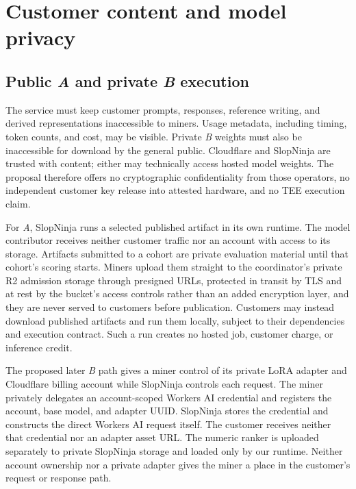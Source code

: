 \section{Customer content and model privacy}\label{confidential-customer-inference}

\subsection{Public \textit{A} and private \textit{B} execution}\label{customer-execution-modes}

The service must keep customer prompts, responses, reference writing, and
derived representations inaccessible to miners. Usage metadata, including
timing, token counts, and cost, may be visible. Private \textit{B} weights must
also be inaccessible for download by the general public. Cloudflare and
SlopNinja are trusted with content; either may technically access hosted model
weights. The proposal therefore offers no cryptographic confidentiality from
those operators, no independent customer key release into attested hardware,
and no TEE execution claim.

For \textit{A}, SlopNinja runs a selected published artifact in its own runtime.
The model contributor receives neither customer traffic nor an account with
access to its storage. Artifacts submitted to a cohort are private evaluation
material until that cohort's scoring starts. Miners upload them straight to the
coordinator's private R2 admission storage through presigned URLs, protected in
transit by TLS and at rest by the bucket's access controls rather than an added
encryption layer, and they are never served to customers before publication. Customers may instead download published artifacts and
run them locally, subject to their dependencies and execution contract. Such a
run creates no hosted job, customer charge, or inference credit.

The proposed later \textit{B} path gives a miner control of its private LoRA
adapter and Cloudflare billing account while SlopNinja controls each request.
The miner privately delegates an account-scoped Workers AI credential and
registers the account, base model, and adapter UUID. SlopNinja stores the
credential and constructs the direct Workers AI request itself. The customer
receives neither that credential nor an adapter asset URL. The numeric ranker
is uploaded separately to private SlopNinja storage and loaded only by our
runtime. Neither account ownership nor a private adapter gives the miner a
place in the customer's request or response path.


